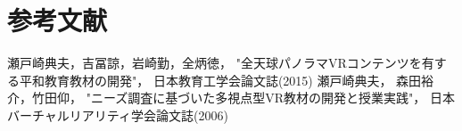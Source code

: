 \section{参考文献}
  \begin{thebibliography}{9}
      瀬戸崎典夫，吉冨諒，岩崎勤，全炳徳，
      "全天球パノラマVRコンテンツを有する平和教育教材の開発"，
      日本教育工学会論文誌(2015)
      瀬戸崎典夫， 森田裕介，竹田仰，
      "ニーズ調査に基づいた多視点型VR教材の開発と授業実践"，
      日本バーチャルリアリティ学会論文誌(2006)
  \end{thebibliography}
